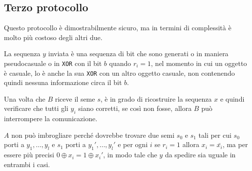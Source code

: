 \subsection{Terzo protocollo}
Questo protocollo è dimostrabilmente sicuro, ma in termini di complessità è molto più
costoso degli altri due.
  
La sequenza $y$ inviata è una sequenza di bit che sono generati o in maniera pseudocasuale 
o in \texttt{XOR} con il bit $b$ quando $r_i = 1$, nel momento in cui un oggetto è casuale,
lo è anche la sua \texttt{XOR} con un altro oggetto casuale, non contenendo quindi nessuna 
informazione circa il bit $b$.

Una volta che $B$ riceve il seme $s$, è in grado di ricostruire la sequenza $x$ e quindi
verificare che tutti gli $y_i$ siano corretti, se così non fosse, allora $B$ può
interrompere la comunicazione.

$A$ non può imbrogliare perché dovrebbe trovare due semi $s_0$ e $s_1$ tali
per cui $s_0$ porti a $y_1,\dots,y_l$ e $s_1$ porti a
$y_1',\dots,y_l'$ e per ogni $i$ se $r_i = 1$ allora $x_i = \bar{x_i}$, ma per essere più precisi 
$0 \oplus x_i = 1 \oplus x_i'$, in modo tale che $y$ da spedire sia uguale in entrambi i casi.